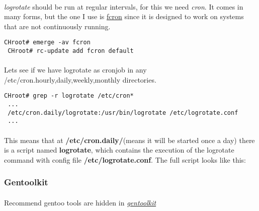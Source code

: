 \documentclass[10pt,a4paper]{article}
\begin{document}
                    \paragraph{} \textit{logrotate} should be run at regular intervals, for this we need \textit{cron}. It comes in many forms, but the one I use is \href{https://wiki.gentoo.org/wiki/Cron#fcron}{fcron} since it is designed to work on systems that are not continuously running.
                    
                    \begin{lstlisting}[style=BashInputCHRoot]
 CHroot# emerge -av fcron
 CHroot# rc-update add fcron default
                    \end{lstlisting}
                    
                    \paragraph{} Lets see if we have logrotate as cronjob in any /etc/cron.{hourly,daily,weekly,monthly} directories. 
                    
                    \begin{lstlisting}[style=BashInputCHRoot]
 CHroot# grep -r logrotate /etc/cron*
 ...
 /etc/cron.daily/logrotate:/usr/bin/logrotate /etc/logrotate.conf
 ...
                    \end{lstlisting}
                    
                    \paragraph{} This means that at \textbf{/etc/cron.daily/}(means it will be started once a day) there is a script named \textbf{logrotate}, which contains the execution of the logrotate command with config file \textbf{/etc/logrotate.conf}. The full script looks like this:
                    

                
                \newpage
                \subsubsection{Gentoolkit}
                    
                    \paragraph{} Recommend gentoo tools are hidden in \href{https://wiki.gentoo.org/wiki/Gentoolkit}{\textit{gentoolkit}}
\end{document}
